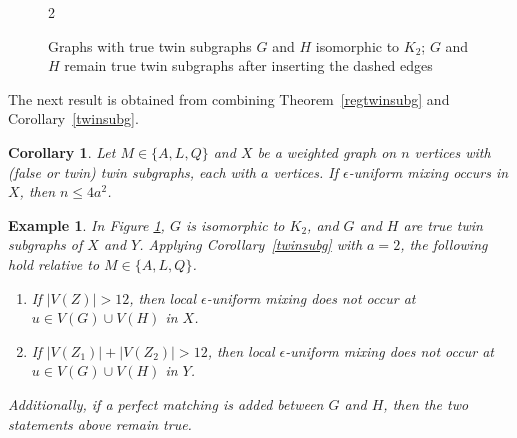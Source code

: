 \documentclass[11pt]{article}
\newtheorem{corollary}{Corollary}
\newtheorem{example}{Example}
\begin{document}
\begin{figure}
\begin{multicols}{2}
\begin{center}
				
\end{center}
\end{multicols}
\caption{\label{fi} Graphs with true twin subgraphs $G$ and $H$ isomorphic to $K_2$; $G$ and $H$ remain true twin subgraphs after inserting the dashed edges}
\end{figure}

The next result is obtained from combining Theorem~\ref{regtwinsubg} and Corollary~\ref{twinsubg}.

\begin{corollary}
\label{corintro}
Let $M\in\{A,L,Q\}$ and $X$ be a weighted graph on $n$ vertices with (false or twin) twin subgraphs, each with $a$ vertices. If $\epsilon$-uniform mixing occurs in $X$, then $n\leq 4a^2$.
\end{corollary}

\begin{example}
\label{ex2}
In Figure \ref{fi}, $G$ is isomorphic to $K_2$, and $G$ and $H$ are true twin subgraphs of $X$ and $Y$. Applying Corollary~\ref{twinsubg} with $a=2$, the following hold relative to $M\in\{A,L,Q\}$.
\begin{enumerate}
\item If $|V(Z)|>12$, then local $\epsilon$-uniform mixing does not occur at $u\in V(G)\cup V(H)$ in $X$. 
\item If $|V(Z_1)|+|V(Z_2)|>12$, then local $\epsilon$-uniform mixing does not occur at $u\in V(G)\cup V(H)$ in $Y$.
\end{enumerate}
Additionally, if a perfect matching is added between $G$ and $H$, then the two statements above remain true.
\end{example}
\end{document}
